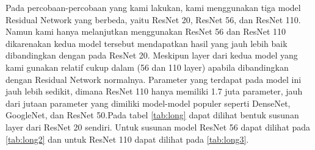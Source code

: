 Pada percobaan-percobaan yang kami lakukan, kami menggunakan tiga model Residual Network yang berbeda, yaitu ResNet 20, ResNet 56, dan ResNet 110. Namun kami hanya melanjutkan menggunakan ResNet 56 dan ResNet 110 dikarenakan kedua model tersebut mendapatkan hasil yang jauh lebih baik dibandingkan dengan pada ResNet 20. Meskipun layer dari kedua model yang kami gunakan relatif cukup dalam (56 dan 110 layer) apabila dibandingkan dengan Residual Network normalnya. Parameter yang terdapat pada model ini jauh lebih sedikit, dimana ResNet 110 hanya memiliki 1.7 juta parameter, jauh dari jutaan parameter yang dimiliki model-model populer seperti DenseNet, GoogleNet, dan ResNet 50.Pada tabel \ref{tab:long} dapat dilihat bentuk susunan layer dari ResNet 20 sendiri. Untuk susunan model ResNet 56 dapat dilihat pada \ref{tab:long2} dan untuk ResNet 110 dapat dilihat pada \ref{tab:long3}.

